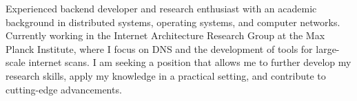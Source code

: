 \par{
    Experienced backend developer and research enthusiast with an
    academic background in distributed systems, operating systems, and
    computer networks. Currently working in the Internet Architecture
    Research Group at the Max Planck Institute, where I focus on DNS and
    the development of tools for large-scale internet scans.
    I am seeking a position that allows me to further develop my
    research skills, apply my knowledge in a practical setting,
    and contribute to cutting-edge advancements.
}